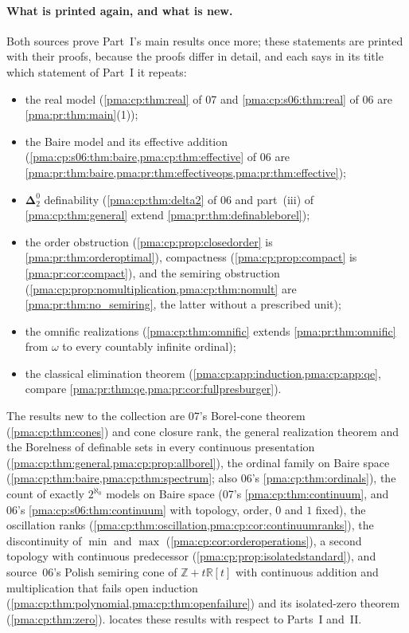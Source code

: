 \documentclass[11pt]{article}
\numberwithin{equation}{section}
\theoremstyle{definition}
\theoremstyle{remark}
\newcommand{\Z}{\mathbb Z}
\newcommand{\R}{\mathbb R}
\newcommand{\Dtwo}{\boldsymbol{\Delta}^{0}_{2}}
\begin{document}
\paragraph{What is printed again, and what is new.} Both sources prove
Part~I's main results once more; these statements are printed with their
proofs, because the proofs differ in detail, and each says in its title which
statement of Part~I it repeats:
\begin{itemize}
\item the real model (\cref{pma:cp:thm:real} of 07 and
\cref{pma:cp:s06:thm:real} of 06 are \cref{pma:pr:thm:main}(1));
\item the Baire model and its effective addition (\cref{pma:cp:s06:thm:baire,pma:cp:thm:effective}
of 06 are \cref{pma:pr:thm:baire,pma:pr:thm:effectiveops,pma:pr:thm:effective});
\item $\Dtwo$ definability (\cref{pma:cp:thm:delta2} of 06 and part~(iii) of
\cref{pma:cp:thm:general} extend \cref{pma:pr:thm:definableborel});
\item the order obstruction (\cref{pma:cp:prop:closedorder} is
\cref{pma:pr:thm:orderoptimal}), compactness (\cref{pma:cp:prop:compact} is
\cref{pma:pr:cor:compact}), and the semiring obstruction
(\cref{pma:cp:prop:nomultiplication,pma:cp:thm:nomult} are
\cref{pma:pr:thm:no_semiring}, the latter without a prescribed unit);
\item the omnific realizations (\cref{pma:cp:thm:omnific} extends
\cref{pma:pr:thm:omnific} from $\omega$ to every countably infinite ordinal);
\item the classical elimination theorem (\cref{pma:cp:app:induction,pma:cp:app:qe},
compare \cref{pma:pr:thm:qe,pma:pr:cor:fullpresburger}).
\end{itemize}
The results new to the collection are 07's Borel-cone theorem
(\cref{pma:cp:thm:cones}) and cone closure rank, the general realization
theorem and the Borelness of definable sets in every continuous presentation
(\cref{pma:cp:thm:general,pma:cp:prop:allborel}), the ordinal family on Baire
space (\cref{pma:cp:thm:baire,pma:cp:thm:spectrum}; also 06's
\cref{pma:cp:thm:ordinals}), the count of exactly $2^{\aleph_0}$ models on
Baire space (07's \cref{pma:cp:thm:continuum}, and 06's
\cref{pma:cp:s06:thm:continuum} with topology, order, $0$ and $1$ fixed), the
oscillation ranks (\cref{pma:cp:thm:oscillation,pma:cp:cor:continuumranks}),
the discontinuity of $\min$ and $\max$ (\cref{pma:cp:cor:orderoperations}), a
second topology with continuous predecessor
(\cref{pma:cp:prop:isolatedstandard}), and source~06's Polish semiring cone
of $\Z+t\R[t]$ with continuous addition and multiplication that fails open
induction (\cref{pma:cp:thm:polynomial,pma:cp:thm:openfailure}) and its
isolated-zero theorem (\cref{pma:cp:thm:zero}). 
locates these results with respect to Parts~I and~II.
\end{document}
